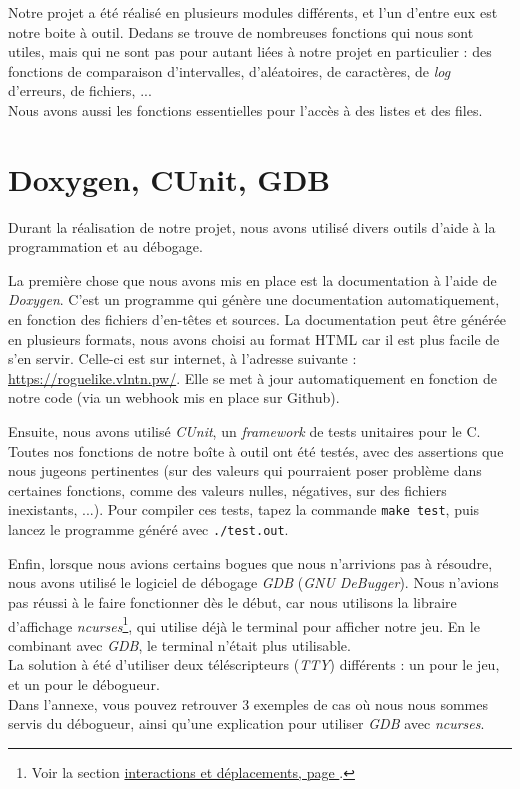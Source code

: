 \documentclass[11pt]{report}
\begin{document}
		Notre projet a été réalisé en plusieurs modules différents, et l'un d'entre eux est notre boite à outil. Dedans se trouve de nombreuses fonctions qui nous sont utiles, mais qui ne sont pas pour autant liées à notre projet en particulier : des fonctions de comparaison d'intervalles, d'aléatoires, de caractères, de \emph{log} d'erreurs, de fichiers, ...\\
		Nous avons aussi les fonctions essentielles pour l'accès à des listes et des files.

	\section{Doxygen, CUnit, GDB}\label{gdb}
	
		Durant la réalisation de notre projet, nous avons utilisé divers outils d'aide à la programmation et au débogage. 
		
		\vspace{12pt}		
		
		La première chose que nous avons mis en place est la documentation à l'aide de \emph{Doxygen}. C'est un programme qui génère une documentation automatiquement, en fonction des fichiers d'en-têtes et sources. La documentation peut être générée en  plusieurs formats, nous avons choisi au format HTML car il est plus facile de s'en servir. Celle-ci est sur internet, à l'adresse suivante : \url{https://roguelike.vlntn.pw/}. Elle se met à jour automatiquement en fonction de notre code (via un webhook mis en place sur Github).
		
		\vspace{12pt}
		
		Ensuite, nous avons utilisé \emph{CUnit}, un \emph{framework} de tests unitaires pour le C. Toutes nos fonctions de notre boîte à outil ont été testés, avec des assertions que nous jugeons pertinentes (sur des valeurs qui pourraient poser problème dans certaines fonctions, comme des valeurs nulles, négatives, sur des fichiers inexistants, ...). Pour compiler ces tests, tapez la commande \texttt{make test}, puis lancez le programme généré avec \texttt{./test.out}.
		
		\vspace{12pt}
		
		Enfin, lorsque nous avions certains bogues que nous n'arrivions pas à résoudre, nous avons utilisé le logiciel de débogage \emph{GDB} (\emph{GNU DeBugger}). Nous n'avions pas réussi à le faire fonctionner dès le début, car nous utilisons la libraire d'affichage \emph{ncurses}\footnote{Voir la section \hyperref[ncurses]{interactions et déplacements, page }.}, qui utilise déjà le terminal pour afficher notre jeu. En le combinant avec \emph{GDB}, le terminal n'était plus utilisable.\\
		La solution à été d'utiliser deux téléscripteurs (\emph{TTY}) différents : un pour le jeu, et un pour le débogueur.\\
		Dans l'annexe, vous pouvez retrouver 3 exemples de cas où nous nous sommes servis du débogueur, ainsi qu'une explication pour utiliser \emph{GDB} avec \emph{ncurses}.
\end{document}
